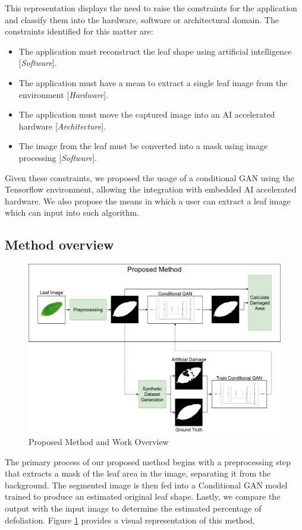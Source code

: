 This representation displays the need to raise the constraints for the application and classify them into the hardware, software or architectural domain. The constraints identified for this matter are:

\begin{itemize}
    \item The application must reconstruct the leaf shape using artificial intelligence [\textit{Software}].
    \item The application must have a mean to extract a single leaf image from the environment [\textit{Hardware}].
    \item The application must move the captured image into an AI accelerated hardware [\textit{Architecture}].
    \item The image from the leaf must be converted into a mask using image processing [\textit{Software}].
\end{itemize}

Given these constraints, we proposed the usage of a conditional GAN using the Tensorflow environment, allowing the integration with embedded AI accelerated hardware. We also propose the means in which a user can extract a leaf image which can input into such algorithm.

\subsection{Method overview}

\begin{figure}[ht!]
    \centering
    \includegraphics[width = .8\linewidth]{Figures/method-overview.png}
    \caption{Proposed Method and Work Overview}
    \label{fig:method-overview}
\end{figure}

The primary process of our proposed method begins with a preprocessing step that extracts a mask of the leaf area in the image, separating it from the background. The segmented image is then fed into a Conditional GAN model trained to produce an estimated original leaf shape. Lastly, we compare the output with the input image to determine the estimated percentage of defoliation. Figure \ref{fig:method-overview} provides a visual representation of this method.

